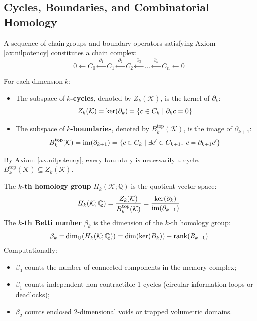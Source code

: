 \subsection{Cycles, Boundaries, and Combinatorial Homology}
A sequence of chain groups and boundary operators satisfying Axiom \ref{ax:nilpotency} constitutes a chain complex:
\begin{equation}
    0 \longleftarrow C_0 \xleftarrow{\; \partial_1 \;} C_1 \xleftarrow{\; \partial_2 \;} C_2 \xleftarrow{\; \partial_3 \;} \dots \xleftarrow{\; \partial_n \;} C_n \longleftarrow 0
\end{equation}

\begin{definition}
For each dimension $k$:
\begin{itemize}[leftmargin=1.5cm]
    \item The subspace of \textbf{$k$-cycles}, denoted by $Z_k(\mathcal{K})$, is the kernel of $\partial_k$:
    \begin{equation}
        Z_k(\mathcal{K}) = \operatorname{ker}(\partial_k) = \{ c \in C_k \mid \partial_k c = 0 \}
    \end{equation}
    \item The subspace of \textbf{$k$-boundaries}, denoted by $B_k^{\text{top}}(\mathcal{K})$, is the image of $\partial_{k+1}$:
    \begin{equation}
        B_k^{\text{top}}(\mathcal{K}) = \operatorname{im}(\partial_{k+1}) = \{ c \in C_k \mid \exists c' \in C_{k+1}, \; c = \partial_{k+1} c' \}
    \end{equation}
\end{itemize}
By Axiom \ref{ax:nilpotency}, every boundary is necessarily a cycle: $B_k^{\text{top}}(\mathcal{K}) \subseteq Z_k(\mathcal{K})$.
\end{definition}

\begin{definition}
The \textbf{$k$-th homology group} $H_k(\mathcal{K}; \mathbb{Q})$ is the quotient vector space:
\begin{equation}
    H_k(\mathcal{K}; \mathbb{Q}) = \frac{Z_k(\mathcal{K})}{B_k^{\text{top}}(\mathcal{K})} = \frac{\operatorname{ker}(\partial_k)}{\operatorname{im}(\partial_{k+1})}
\end{equation}
The \textbf{$k$-th Betti number} $\beta_k$ is the dimension of the $k$-th homology group:
\begin{equation}
    \beta_k = \dim_{\mathbb{Q}}(H_k(\mathcal{K}; \mathbb{Q})) = \dim(\operatorname{ker}(B_k)) - \operatorname{rank}(B_{k+1})
\end{equation}
Computationally:
\begin{itemize}[leftmargin=1.5cm]
    \item $\beta_0$ counts the number of connected components in the memory complex;
    \item $\beta_1$ counts independent non-contractible 1-cycles (circular information loops or deadlocks);
    \item $\beta_2$ counts enclosed 2-dimensional voids or trapped volumetric domains.
\end{itemize}
\end{definition}

